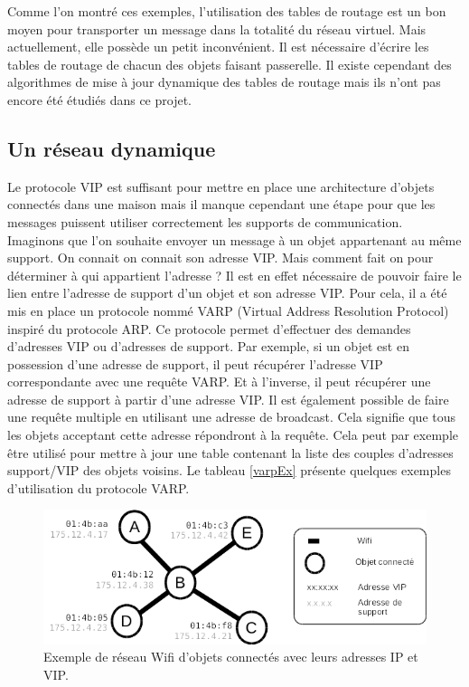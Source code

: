 			Comme l'on montré ces exemples, l'utilisation des tables de routage est un bon moyen pour
			transporter un message dans la totalité du réseau virtuel. Mais actuellement, elle possède
			un petit inconvénient. Il est nécessaire d'écrire les tables de routage de chacun des
			objets faisant passerelle. Il existe cependant des algorithmes de mise à jour dynamique
			des tables de routage mais ils n'ont pas encore été étudiés dans ce projet.

	\subsection{Un réseau dynamique}
		Le protocole VIP est suffisant pour mettre en place une architecture d'objets connectés dans
		une maison mais il manque cependant une étape pour que les messages puissent utiliser
		correctement les supports de communication. Imaginons que l'on souhaite envoyer un message 
		à un objet appartenant au même support. On connait on connait son adresse VIP. Mais comment 
		fait on pour déterminer à qui appartient l'adresse ? Il est en effet nécessaire de pouvoir 
		faire le lien entre l'adresse de support d'un objet et son adresse VIP. Pour cela, il a été
		mis en place un protocole nommé VARP (Virtual Address Resolution Protocol) inspiré du
		protocole ARP. Ce protocole permet d'effectuer des demandes d'adresses VIP ou d'adresses de
		support. Par exemple, si un objet est en possession d'une adresse de support, il peut
		récupérer l'adresse VIP correspondante avec une requête VARP. Et à l'inverse, il peut
		récupérer une adresse de support à partir d'une adresse VIP. Il est également possible de
		faire une requête multiple en utilisant une adresse de broadcast. Cela signifie que tous les
		objets acceptant cette adresse répondront à la requête. Cela peut par exemple être utilisé
		pour mettre à jour une table contenant la liste des couples d'adresses support/VIP des objets
		voisins. Le tableau \ref{varpEx} présente quelques exemples d'utilisation du protocole VARP.
		
		\begin{figure}[!ht]
			\centering
			\includegraphics[width=\textwidth]{img/varp_net.png}
			\caption{Exemple de réseau Wifi d'objets connectés avec leurs adresses IP et VIP.}
			\label{varpNet}
		\end{figure}
		
